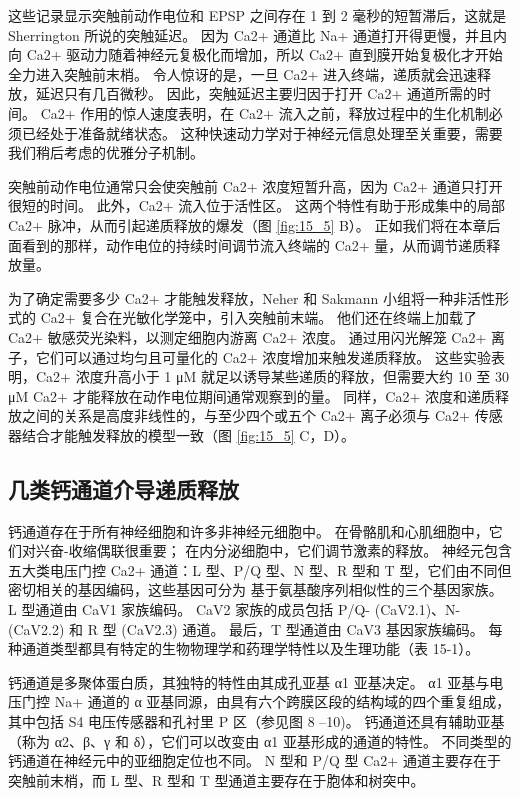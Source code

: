 这些记录显示突触前动作电位和 EPSP 之间存在 1 到 2 毫秒的短暂滞后，这就是 Sherrington 所说的突触延迟。
因为 Ca2+ 通道比 Na+ 通道打开得更慢，并且内向 Ca2+ 驱动力随着神经元复极化而增加，所以 Ca2+ 直到膜开始复极化才开始全力进入突触前末梢。
令人惊讶的是，一旦 Ca2+ 进入终端，递质就会迅速释放，延迟只有几百微秒。
因此，突触延迟主要归因于打开 Ca2+ 通道所需的时间。
Ca2+ 作用的惊人速度表明，在 Ca2+ 流入之前，释放过程中的生化机制必须已经处于准备就绪状态。 
这种快速动力学对于神经元信息处理至关重要，需要我们稍后考虑的优雅分子机制。


突触前动作电位通常只会使突触前 Ca2+ 浓度短暂升高，因为 Ca2+ 通道只打开很短的时间。 
此外，Ca2+ 流入位于活性区。 这两个特性有助于形成集中的局部 Ca2+ 脉冲，从而引起递质释放的爆发（图 \ref{fig:15_5} B）。 
正如我们将在本章后面看到的那样，动作电位的持续时间调节流入终端的 Ca2+ 量，从而调节递质释放量。


为了确定需要多少 Ca2+ 才能触发释放，Neher 和 Sakmann 小组将一种非活性形式的 Ca2+ 复合在光敏化学笼中，引入突触前末端。
他们还在终端上加载了 Ca2+ 敏感荧光染料，以测定细胞内游离 Ca2+ 浓度。 
通过用闪光解笼 Ca2+ 离子，它们可以通过均匀且可量化的 Ca2+ 浓度增加来触发递质释放。 
这些实验表明，Ca2+ 浓度升高小于 1 μM 就足以诱导某些递质的释放，但需要大约 10 至 30 μM Ca2+ 才能释放在动作电位期间通常观察到的量。 
同样，Ca2+ 浓度和递质释放之间的关系是高度非线性的，与至少四个或五个 Ca2+ 离子必须与 Ca2+ 传感器结合才能触发释放的模型一致（图 \ref{fig:15_5} C，D）。



\subsection{几类钙通道介导递质释放}

钙通道存在于所有神经细胞和许多非神经元细胞中。 
在骨骼肌和心肌细胞中，它们对兴奋-收缩偶联很重要； 在内分泌细胞中，它们调节激素的释放。 
神经元包含五大类电压门控 Ca2+ 通道：L 型、P/Q 型、N 型、R 型和 T 型，它们由不同但密切相关的基因编码，这些基因可分为 基于氨基酸序列相似性的三个基因家族。 
L 型通道由 CaV1 家族编码。 
CaV2 家族的成员包括 P/Q- (CaV2.1)、N- (CaV2.2) 和 R 型 (CaV2.3) 通道。 
最后，T 型通道由 CaV3 基因家族编码。 
每种通道类型都具有特定的生物物理学和药理学特性以及生理功能（表 15-1）。


钙通道是多聚体蛋白质，其独特的特性由其成孔亚基 α1 亚基决定。 
α1 亚基与电压门控 Na+ 通道的 α 亚基同源，由具有六个跨膜区段的结构域的四个重复组成，其中包括 S4 电压传感器和孔衬里 P 区（参见图 8 –10)。
钙通道还具有辅助亚基（称为 α2、β、γ 和 δ），它们可以改变由 α1 亚基形成的通道的特性。 
不同类型的钙通道在神经元中的亚细胞定位也不同。 
N 型和 P/Q 型 Ca2+ 通道主要存在于突触前末梢，而 L 型、R 型和 T 型通道主要存在于胞体和树突中。


